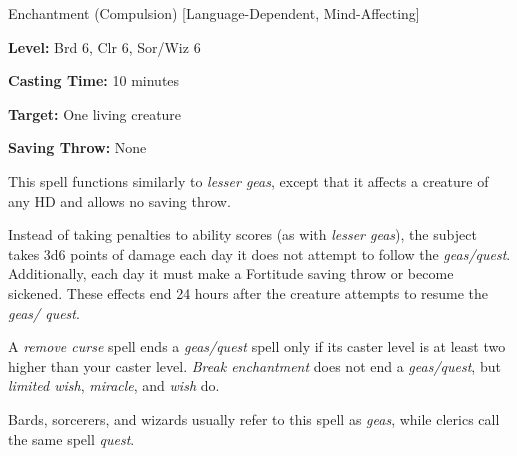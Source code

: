 \label{spell:Geas}\label{spell:Quest}

Enchantment (Compulsion) [Language-Dependent, Mind-Affecting]

\textbf{Level:} Brd 6, Clr 6, Sor/Wiz 6

\textbf{Casting Time:} 10 minutes

\textbf{Target:} One living creature

\textbf{Saving Throw:} None

This spell functions similarly to \textit{lesser geas}, except that it affects 
a creature of any HD and allows no saving throw.

Instead of taking penalties to ability scores (as with \textit{lesser geas}), the 
subject takes 3d6 points of damage each day it does not attempt to follow the \textit{geas/quest}. 
Additionally, each day it must make a Fortitude saving throw or become sickened. 
These effects end 24 hours after the creature attempts to resume the \textit{geas/ 
quest}.

A \textit{remove curse} spell ends a \textit{geas/quest} spell only if its caster 
level is at least two higher than your caster level. \textit{Break enchantment 
}does not end a \textit{geas/quest}, but \textit{limited wish}, \textit{miracle}, 
and \textit{wish} do.

Bards, sorcerers, and wizards usually refer to this spell as \textit{geas}, while 
clerics call the same spell \textit{quest}.

